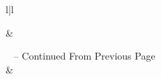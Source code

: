         
         \begin{longtable}{l|l}
            \caption{$n$-Gram Chilean Cities, Excluded and Included in Step 3 of Applied Methodology} \label{app:tab_ngrams}
            
            \hline\hline {} &  \\ \hline 
            \endfirsthead
            
            {{\tablename\ \thetable{} -- Continued From Previous Page}} \\
            \hline {} &   \\ \hline 
            \endhead
            
            \hline {} 
            \endfoot
            
            \hline \hline
            \endlastfoot
            

\end{longtable}
